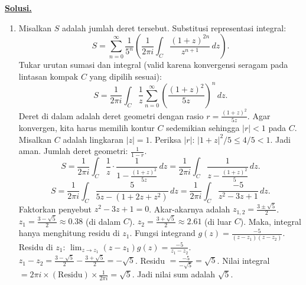 \documentclass[12pt,twoside]{article}
\newenvironment{solution}
{
	\par\noindent\textbf{\underline{Solusi.}}\\
}
{
	\par
}
\begin{document}
\begin{enumerate}
\begin{solution}
\begin{enumerate}
            \item[(b)] Misalkan $S$ adalah jumlah deret tersebut. Substitusi representasi integral:
                  $$ S = \sum_{n=0}^\infty \frac{1}{5^n} \left( \frac{1}{2\pi i} \int_C \frac{(1+z)^{2n}}{z^{n+1}} \, dz \right). $$
                  Tukar urutan sumasi dan integral (valid karena konvergensi seragam pada lintasan kompak $C$ yang dipilih sesuai):
                  $$ S = \frac{1}{2\pi i} \int_C \frac{1}{z} \sum_{n=0}^\infty \left( \frac{(1+z)^2}{5z} \right)^n \, dz. $$
                  Deret di dalam adalah deret geometri dengan rasio $r = \frac{(1+z)^2}{5z}$.
                  Agar konvergen, kita harus memilih kontur $C$ sedemikian sehingga $|r| < 1$ pada $C$.
                  Misalkan $C$ adalah lingkaran $|z|=1$. Periksa $|r|$: $|1+z|^2/5 \le 4/5 < 1$. Jadi aman.
                  Jumlah deret geometri: $\frac{1}{1-r}$.
                  $$ S = \frac{1}{2\pi i} \int_C \frac{1}{z} \cdot \frac{1}{1 - \frac{(1+z)^2}{5z}} \, dz = \frac{1}{2\pi i} \int_C \frac{1}{z - \frac{(1+z)^2}{5}} \, dz. $$
                  $$ S = \frac{1}{2\pi i} \int_C \frac{5}{5z - (1+2z+z^2)} \, dz = \frac{1}{2\pi i} \int_C \frac{-5}{z^2 - 3z + 1} \, dz. $$
                  Faktorkan penyebut $z^2 - 3z + 1 = 0$. Akar-akarnya adalah $z_{1,2} = \frac{3 \pm \sqrt{5}}{2}$.
                  $z_1 = \frac{3-\sqrt{5}}{2} \approx 0.38$ (di dalam $C$).
                  $z_2 = \frac{3+\sqrt{5}}{2} \approx 2.61$ (di luar $C$).
                  Maka, integral hanya menghitung residu di $z_1$.
                  Fungsi integrand $g(z) = \frac{-5}{(z-z_1)(z-z_2)}$.
                  Residu di $z_1$: $\lim_{z \to z_1} (z-z_1) g(z) = \frac{-5}{z_1 - z_2}$.
                  $z_1 - z_2 = \frac{3-\sqrt{5}}{2} - \frac{3+\sqrt{5}}{2} = -\sqrt{5}$.
                  Residu $= \frac{-5}{-\sqrt{5}} = \sqrt{5}$.
                  Nilai integral $= 2\pi i \times (\text{Residu}) \times \frac{1}{2\pi i} = \sqrt{5}$.
                  Jadi nilai sum adalah $\sqrt{5}$.
          \end{enumerate}
        \end{solution}


\end{enumerate}
\end{document}
